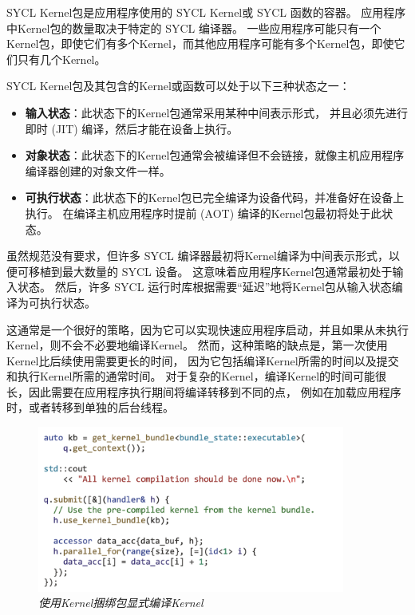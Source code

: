 SYCL Kernel包是应用程序使用的 SYCL Kernel或 SYCL 函数的容器。 
应用程序中Kernel包的数量取决于特定的 SYCL 编译器。 
一些应用程序可能只有一个Kernel包，即使它们有多个Kernel，而其他应用程序可能有多个Kernel包，即使它们只有几个Kernel。

SYCL Kernel包及其包含的Kernel或函数可以处于以下三种状态之一：

\begin{itemize}
	\item \textbf{输入状态}：此状态下的Kernel包通常采用某种中间表示形式，
	并且必须先进行即时 (JIT) 编译，然后才能在设备上执行。

	\item \textbf{对象状态}：此状态下的Kernel包通常会被编译但不会链接，就像主机应用程序编译器创建的对象文件一样。

	\item \textbf{可执行状态}：此状态下的Kernel包已完全编译为设备代码，并准备好在设备上执行。 
	在编译主机应用程序时提前 (AOT) 编译的Kernel包最初将处于此状态。
\end{itemize}

虽然规范没有要求，但许多 SYCL 编译器最初将Kernel编译为中间表示形式，以便可移植到最大数量的 SYCL 设备。 
这意味着应用程序Kernel包通常最初处于输入状态。 
然后，许多 SYCL 运行时库根据需要“延迟”地将Kernel包从输入状态编译为可执行状态。

这通常是一个很好的策略，因为它可以实现快速应用程序启动，并且如果从未执行Kernel，则不会不必要地编译Kernel。 
然而，这种策略的缺点是，第一次使用Kernel比后续使用需要更长的时间，
因为它包括编译Kernel所需的时间以及提交和执行Kernel所需的通常时间。 
对于复杂的Kernel，编译Kernel的时间可能很长，因此需要在应用程序执行期间将编译转移到不同的点，
例如在加载应用程序时，或者转移到单独的后台线程。

\begin{figure}[H]
	\centering
	\includegraphics[width=0.9\textwidth]{figs/F10.8.png}
	\caption{\textit{使用Kernel捆绑包显式编译Kernel }}
\end{figure}

